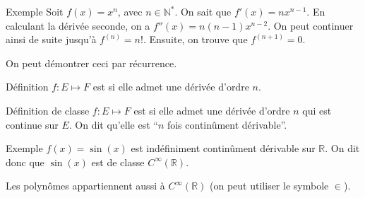 \documentclass[a4paper]{article}
\begin{document}
\begin{parag}{Exemple}
    Soit $f\left(x\right) = x^n$, avec $n \in\mathbb{N}^*$. On sait que $f'\left(x\right) = nx^{n-1}$. En calculant la dérivée seconde, on a $f''\left(x\right) = n\left(n-1\right)x^{n-2}$. On peut continuer ainsi de suite jusqu'à $f^{\left(n\right)} = n!$. Ensuite, on trouve que $f^{\left(n+1\right)} = 0$.

    On peut démontrer ceci par récurrence.
\end{parag}

\begin{parag}{Définition}
   $f : E \mapsto F$ est  si elle admet une dérivée d'ordre $n$.
\end{parag}

\begin{parag}{Définition de classe}
    $f : E \mapsto F$ est  si elle admet une dérivée d'ordre $n$ qui est continue sur $E$. On dit qu'elle est ``$n$ fois continûment dérivable''.
\end{parag}

\begin{parag}{Exemple}
    $f\left(x\right) = \sin\left(x\right)$ est indéfiniment continûment dérivable sur $\mathbb{R}$. On dit donc que $\sin\left(x\right)$ est de classe $C^{\infty}\left(\mathbb{R}\right)$.

    Les polynômes appartiennent aussi à $C^{\infty}\left(\mathbb{R}\right)$ (on peut utiliser le symbole $\in$).
\end{parag}
\end{document}
